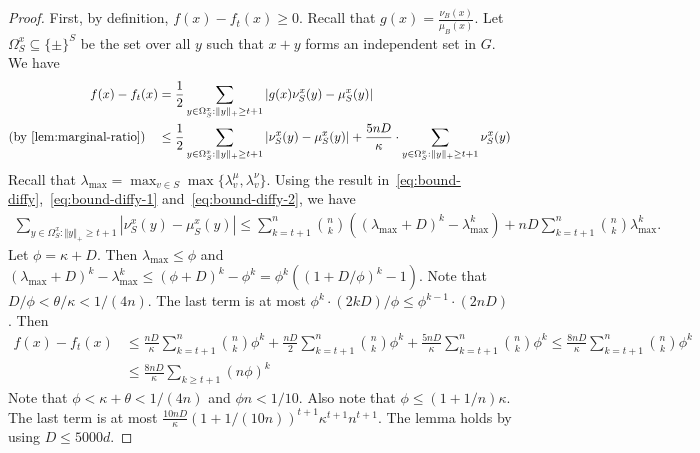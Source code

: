 \begin{proof} %
First, by definition, $ f(x)-f_t(x)\geq 0$.
Recall that $g(x) = \frac{\nu_B(x)}{\mu_B(x)}$.
Let $\Omega_S^x \subseteq \{\pm\}^S$ be the set over all $y$ such that $x + y$ forms an independent set in $G$.
We have
\begin{align*}
f(x) - f_t(x) &= \frac{1}{2}\sum_{y \in \Omega_S^x: \Vert y\Vert_+ \geq t+1}\left|g(x)\nu_S^x(y) - \mu_S^x(y)\right|\\
\text{(by \Cref{lem:marginal-ratio})} \quad &\leq \frac{1}{2}\sum_{y \in \Omega_S^x: \Vert y\Vert_+ \geq t+1}\left|\nu_S^x(y) - \mu_S^x(y)\right| + \frac{5 nD}{\kappa} \cdot\sum_{y \in \Omega_S^x: \Vert y\Vert_+ \geq t+1}\nu_S^x(y)
\end{align*}
Recall that $\lambda_{\max} = \max_{v \in S} \max \{\lambda_v^\mu,\lambda_v^\nu\}$. Using the result in~\eqref{eq:bound-diffy},~\eqref{eq:bound-diffy-1} and~\eqref{eq:bound-diffy-2}, we have
\begin{align*}
    \sum_{y \in \Omega_S^x: \Vert y\Vert_+ \geq t+1}\left|\nu_S^x(y) - \mu_S^x(y)\right| \leq \sum_{k=t+1}^n \binom{n}{k} \left((\lambda_{\max}+D)^k - \lambda_{\max}^k\right) +   nD \sum_{k=t+1}^n \binom{n}{k} \lambda_{\max}^{k}.
\end{align*}
Let $\phi = \kappa + D$. Then $\lambda_{\max} \leq \phi$ and $(\lambda_{\max}+D)^k - \lambda_{\max}^k \leq (\phi+D)^k - \phi^k =\phi^k( (1+D/\phi)^k - 1 )$. Note  that $D/\phi < \theta/\kappa < 1/(4n)$. The last term is at most $\phi^k\cdot (2kD)/\phi \leq \phi^{k-1}\cdot (2nD)$. Then 
\begin{align*}
    f(x) - f_t(x)  &\leq \frac{nD}{\kappa}\sum_{k=t+1}^n \binom{n}{k} \phi^{k} +   \frac{nD}{2} \sum_{k=t+1}^n \binom{n}{k} \phi^k + \frac{5nD}{\kappa}\sum_{k=t+1}^n \binom{n}{k} \phi^k \leq \frac{8nD}{\kappa} \sum_{k=t+1}^n \binom{n}{k} \phi^k\\
    &\leq \frac{8nD}{\kappa}\sum_{k\geq t+1} (n\phi)^k
\end{align*}
Note that $\phi < \kappa + \theta < 1/(4n)$ and $\phi n < 1/10$. Also note that $\phi \leq (1+1/n)\kappa$. The last term is at most $ \frac{10nD}{\kappa} \left( 1 + 1/(10n) \right)^{t+1}\kappa^{t+1} n^{t+1}$. The lemma holds by using $D \leq 5000d$.
\end{proof}






